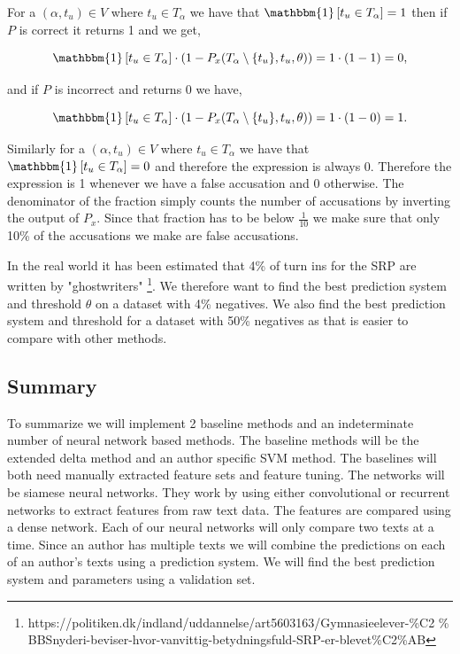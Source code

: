 For a $(\alpha, t_u) \in V$ where $t_u \in T_\alpha$ we have that
$\mathbbm{1}\left[t_u \in T_\alpha\right] = 1$ then if $P$ is correct it returns 1 and we
get,

\begin{equation}
    \mathbbm{1}\left[t_u \in T_\alpha\right] \cdot
    \left(1 - P_x(T_\alpha \setminus \{t_u\}, t_u, \theta)\right) =
    1 \cdot (1 - 1) = 0,
\end{equation}

and if $P$ is incorrect and returns 0 we have,

\begin{equation}
    \mathbbm{1}\left[t_u \in T_\alpha\right] \cdot
    \left(1 - P_x(T_\alpha \setminus \{t_u\}, t_u, \theta)\right) =
    1 \cdot (1 - 0) = 1.
\end{equation}

Similarly for a $(\alpha, t_u) \in V$ where $t_u \in T_\alpha$ we have that
$\mathbbm{1}\left[t_u \in T_\alpha\right] = 0$ and therefore the expression is
always 0. Therefore the expression is 1 whenever we have a false accusation
and 0 otherwise. The denominator of the fraction simply counts the number of
accusations by inverting the output of $P_x$. Since that fraction has to be
below $\frac{1}{10}$ we make sure that only 10\% of the accusations we make are
false accusations.

In the real world it has been estimated that 4\% of turn
ins for the \gls{SRP} are written by "ghostwriters"
\footnote{https://politiken.dk/indland/uddannelse/art5603163/Gymnasieelever-\%C2
\% BBSnyderi-beviser-hvor-vanvittig-betydningsfuld-SRP-er-blevet\%C2\%AB}.
We therefore want to find the best prediction system and threshold $\theta$
on a dataset with 4\% negatives. We also find the best prediction system and
threshold for a dataset with 50\% negatives as that is easier to compare with
other methods.


\subsection{Summary}

To summarize we will implement 2 baseline methods and an indeterminate number of
neural network based methods. The baseline methods will be the extended delta
method and an author specific \gls{SVM} method. The baselines will both need
manually extracted feature sets and feature tuning. The networks will be siamese
neural networks. They work by using either convolutional or recurrent networks
to extract features from raw text data. The features are compared using a dense
network. Each of our neural networks will only compare two texts at a time.
Since an author has multiple texts we will combine the predictions on each of
an author's texts using a prediction system. We will find the best prediction
system and parameters using a validation set.

